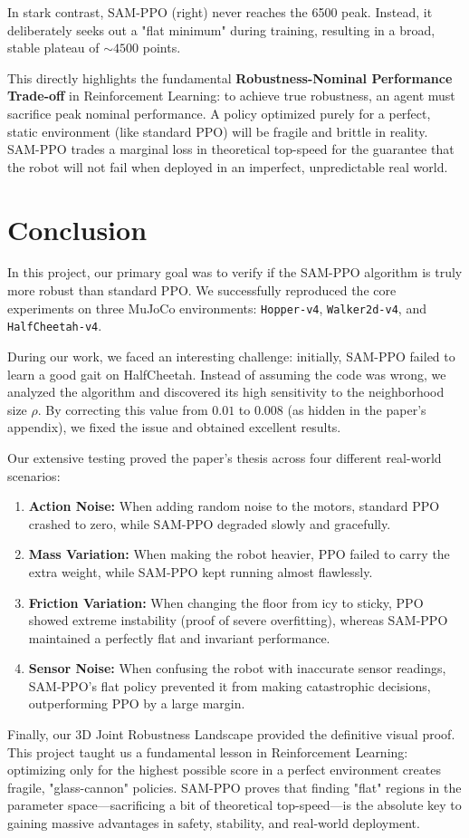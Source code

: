 \documentclass{article}
\begin{document}
In stark contrast, SAM-PPO (right) never reaches the 6500 peak. Instead, it deliberately seeks out a "flat minimum" during training, resulting in a broad, stable plateau of $\sim 4500$ points. 

This directly highlights the fundamental \textbf{Robustness-Nominal Performance Trade-off} in Reinforcement Learning: to achieve true robustness, an agent must sacrifice peak nominal performance. A policy optimized purely for a perfect, static environment (like standard PPO) will be fragile and brittle in reality. SAM-PPO trades a marginal loss in theoretical top-speed for the guarantee that the robot will not fail when deployed in an imperfect, unpredictable real world.

\section{Conclusion}
In this project, our primary goal was to verify if the SAM-PPO algorithm is truly more robust than standard PPO. We successfully reproduced the core experiments on three MuJoCo environments: \texttt{Hopper-v4}, \texttt{Walker2d-v4}, and \texttt{HalfCheetah-v4}.

During our work, we faced an interesting challenge: initially, SAM-PPO failed to learn a good gait on HalfCheetah. Instead of assuming the code was wrong, we analyzed the algorithm and discovered its high sensitivity to the neighborhood size $\rho$. By correcting this value from $0.01$ to $0.008$ (as hidden in the paper's appendix), we fixed the issue and obtained excellent results.

Our extensive testing proved the paper's thesis across four different real-world scenarios:
\begin{enumerate}
    \item \textbf{Action Noise:} When adding random noise to the motors, standard PPO crashed to zero, while SAM-PPO degraded slowly and gracefully.
    \item \textbf{Mass Variation:} When making the robot heavier, PPO failed to carry the extra weight, while SAM-PPO kept running almost flawlessly.
    \item \textbf{Friction Variation:} When changing the floor from icy to sticky, PPO showed extreme instability (proof of severe overfitting), whereas SAM-PPO maintained a perfectly flat and invariant performance.
    \item \textbf{Sensor Noise:} When confusing the robot with inaccurate sensor readings, SAM-PPO's flat policy prevented it from making catastrophic decisions, outperforming PPO by a large margin.
\end{enumerate}

Finally, our 3D Joint Robustness Landscape provided the definitive visual proof. This project taught us a fundamental lesson in Reinforcement Learning: optimizing only for the highest possible score in a perfect environment creates fragile, "glass-cannon" policies. SAM-PPO proves that finding "flat" regions in the parameter space---sacrificing a bit of theoretical top-speed---is the absolute key to gaining massive advantages in safety, stability, and real-world deployment.
\end{document}
